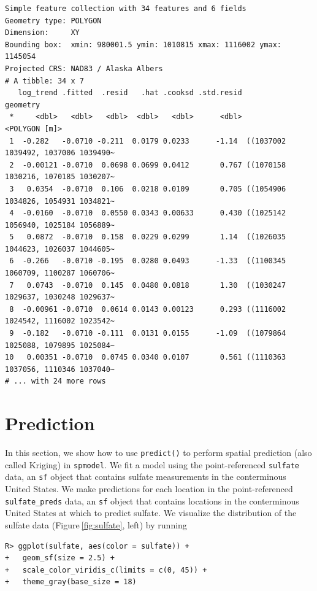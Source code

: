 \documentclass{article}
\begin{document}
\begin{verbatim}
Simple feature collection with 34 features and 6 fields
Geometry type: POLYGON
Dimension:     XY
Bounding box:  xmin: 980001.5 ymin: 1010815 xmax: 1116002 ymax: 1145054
Projected CRS: NAD83 / Alaska Albers
# A tibble: 34 x 7
   log_trend .fitted  .resid   .hat .cooksd .std.resid                            geometry
 *     <dbl>   <dbl>   <dbl>  <dbl>   <dbl>      <dbl>                       <POLYGON [m]>
 1  -0.282   -0.0710 -0.211  0.0179 0.0233      -1.14  ((1037002 1039492, 1037006 1039490~
 2  -0.00121 -0.0710  0.0698 0.0699 0.0412       0.767 ((1070158 1030216, 1070185 1030207~
 3   0.0354  -0.0710  0.106  0.0218 0.0109       0.705 ((1054906 1034826, 1054931 1034821~
 4  -0.0160  -0.0710  0.0550 0.0343 0.00633      0.430 ((1025142 1056940, 1025184 1056889~
 5   0.0872  -0.0710  0.158  0.0229 0.0299       1.14  ((1026035 1044623, 1026037 1044605~
 6  -0.266   -0.0710 -0.195  0.0280 0.0493      -1.33  ((1100345 1060709, 1100287 1060706~
 7   0.0743  -0.0710  0.145  0.0480 0.0818       1.30  ((1030247 1029637, 1030248 1029637~
 8  -0.00961 -0.0710  0.0614 0.0143 0.00123      0.293 ((1116002 1024542, 1116002 1023542~
 9  -0.182   -0.0710 -0.111  0.0131 0.0155      -1.09  ((1079864 1025088, 1079895 1025084~
10   0.00351 -0.0710  0.0745 0.0340 0.0107       0.561 ((1110363 1037056, 1110346 1037040~
# ... with 24 more rows
\end{verbatim}

\hypertarget{sec:prediction}{%
\section{Prediction}\label{sec:prediction}}

In this section, we show how to use \texttt{predict()} to perform
spatial prediction (also called Kriging) in \texttt{spmodel}. We fit a
model using the point-referenced \texttt{sulfate} data, an \texttt{sf}
object that contains sulfate measurements in the conterminous United
States. We make predictions for each location in the point-referenced
\texttt{sulfate\_preds} data, an \texttt{sf} object that contains
locations in the conterminous United States at which to predict sulfate.
We visualize the distribution of the sulfate data
(Figure\(~\)\ref{fig:sulfate}, left) by running

\begin{verbatim}
R> ggplot(sulfate, aes(color = sulfate)) +
+   geom_sf(size = 2.5) +
+   scale_color_viridis_c(limits = c(0, 45)) +
+   theme_gray(base_size = 18)
\end{verbatim}
\end{document}
